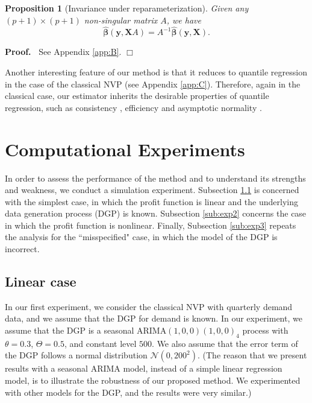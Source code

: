 \documentclass{article}
\newtheorem{proposition}{Proposition}
\newenvironment{proof}
 {\begin{trivlist} \item[] {\bf Proof.\ }}{\hfill$\Box$ \end{trivlist}}
\begin{document}
\begin{proposition}[Invariance under reparameterization]
Given any $(p+1)\times (p+1)$ non-singular matrix $A$, we have
\[
        \hat{\boldsymbol{\beta}}(\mathbf{y},\mathbf{X}A)=A^{-1}\hat{\boldsymbol{\beta}}(\mathbf{y},\mathbf{X}).
\]
\end{proposition}
\begin{proof}
See Appendix \ref{app:B}.
\end{proof}

Another interesting feature of our method is that it reduces to quantile regression in the case of the classical NVP (see Appendix \ref{app:C}). Therefore, again in the classical case, our estimator
inherits the desirable properties of quantile regression, such as
consistency \cite{Koe05}, efficiency \cite{KM99} and asymptotic
normality \cite{KHM05}.

\section{Computational Experiments} \label{se:results}

In order to assess the performance of the method and to understand its strengths and weakness, we conduct a simulation experiment. Subsection \ref{sub:exp1} is concerned with the simplest case, in which the profit function is linear and the underlying data generation process (DGP) is known. Subsection \ref{sub:exp2} concerns the case in which the profit function is nonlinear. Finally, Subsection \ref{sub:exp3} repeats the analysis for the ``misspecified" case, in which the model of the DGP is incorrect.

\subsection{Linear case} \label{sub:exp1}

In our first experiment, we consider the classical NVP with quarterly demand data, and we assume that the DGP for demand is known. In our experiment, we assume that the DGP is a seasonal ARIMA$(1,0,0)(1,0,0)_4$ process with $\theta=0.3$, $\Theta=0.5$, and constant level $500$. We also assume that the error term of the DGP follows a normal distribution $\mathcal{N}(0,200^2)$.
(The reason that we present results with a seasonal ARIMA model, instead of a simple linear regression model, is to illustrate the robustness of our proposed method. We experimented with other models for the DGP, and the results were very similar.)
\end{document}
